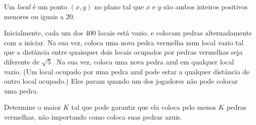 Um \textit{local} é um ponto $(x, y)$ no plano tal que $x$ e $y$ são ambos inteiros positivos
menores ou iguais a $20$.

Inicialmente, cada um dos $400$ locais está vazio.  e  colocam pedras alternadamente com  a iniciar. Na sua vez,  coloca uma nova pedra vermelha num local vazio tal que a distância entre quaisquer dois locais ocupados por pedras vermelhas seja diferente de $\sqrt{5}$. Na sua vez,  coloca uma nova pedra azul em qualquer local vazio. (Um local ocupado por uma pedra azul pode
estar a qualquer distância de outro local ocupado.) Eles param quando um dos jogadores não pode colocar uma pedra.

Determine o maior $K$ tal que  pode garantir que ela coloca pelo menos $K$ pedras vermelhas, não importando como  coloca suas pedras azuis.